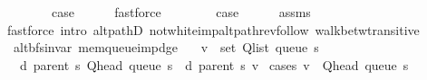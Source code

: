 \begin{isabellebody}
\ \ \isamarkupfalse%
\isanewline
\ \ \isamarkupfalse%
\ \isamarkupfalse%
\ {\isacharquery}{\kern0pt}case\isanewline
\ \ \ \ \isamarkupfalse%
\ fastforce\isanewline
{}\isamarkupfalse%
\isanewline
\ \ \isamarkupfalse%
\ {}\isanewline
\ \ \isamarkupfalse%
\ {\isacharquery}{\kern0pt}case\isanewline
\ \ \ \ \isamarkupfalse%
\ assms\isanewline
\ \ \ \ \isamarkupfalse%
\ {\isacharparenleft}{\kern0pt}fastforce\ intro{\isacharcolon}{\kern0pt}\ alt{\isacharunderscore}{\kern0pt}pathD{\isacharparenleft}{\kern0pt}{}{\isacharparenright}{\kern0pt}\ not{\isacharunderscore}{\kern0pt}white{\isacharunderscore}{\kern0pt}imp{\isacharunderscore}{\kern0pt}alt{\isacharunderscore}{\kern0pt}path{\isacharunderscore}{\kern0pt}rev{\isacharunderscore}{\kern0pt}follow\ walk{\isacharunderscore}{\kern0pt}betw{\isacharunderscore}{\kern0pt}transitive{\isacharunderscore}{\kern0pt}{}{\isacharparenright}{\kern0pt}\isanewline
{}\isamarkupfalse%
%
\endisatagproof
{\isafoldproof}%
%
\isadelimproof
\isanewline
%
\endisadelimproof
\isanewline
{}\isamarkupfalse%
\ {\isacharparenleft}{\kern0pt}\ alt{\isacharunderscore}{\kern0pt}bfs{\isacharunderscore}{\kern0pt}invar{\isacharparenright}{\kern0pt}\ mem{\isacharunderscore}{\kern0pt}queue{\isacharunderscore}{\kern0pt}imp{\isacharunderscore}{\kern0pt}d{\isacharunderscore}{\kern0pt}ge{\isacharcolon}{\kern0pt}\isanewline
\ \ \ {\isachardoublequoteopen}v\ {\isasymin}\ set\ {\isacharparenleft}{\kern0pt}Q{\isacharunderscore}{\kern0pt}list\ {\isacharparenleft}{\kern0pt}queue\ s{\isacharparenright}{\kern0pt}{\isacharparenright}{\kern0pt}{\isachardoublequoteclose}\isanewline
\ \ \ {\isachardoublequoteopen}d\ {\isacharparenleft}{\kern0pt}parent\ s{\isacharparenright}{\kern0pt}\ {\isacharparenleft}{\kern0pt}Q{\isacharunderscore}{\kern0pt}head\ {\isacharparenleft}{\kern0pt}queue\ s{\isacharparenright}{\kern0pt}{\isacharparenright}{\kern0pt}\ {\isasymle}\ d\ {\isacharparenleft}{\kern0pt}parent\ s{\isacharparenright}{\kern0pt}\ v{\isachardoublequoteclose}\isanewline
%
\isadelimproof
%
\endisadelimproof
%
\isatagproof
{}\isamarkupfalse%
\ {\isacharparenleft}{\kern0pt}cases\ {\isachardoublequoteopen}v\ {\isacharequal}{\kern0pt}\ Q{\isacharunderscore}{\kern0pt}head\ {\isacharparenleft}{\kern0pt}queue\ s{\isacharparenright}{\kern0pt}{\isachardoublequoteclose}{\isacharparenright}{\kern0pt}\isanewline

\end{isabellebody}
